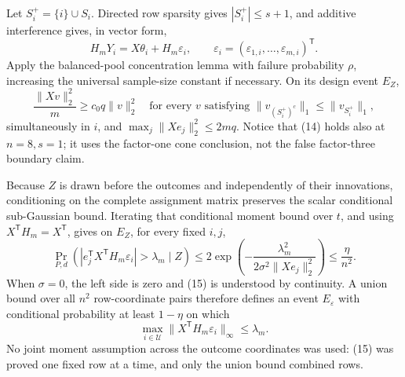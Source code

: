 Let \(S_i^+=\{i\}\cup S_i\).  Directed row sparsity gives \(|S_i^+|\le s+1\), and additive interference gives, in vector form,
\[
 H_mY_i=X\theta_i+H_m\varepsilon_i,
 \qquad
 \varepsilon_i=(\varepsilon_{1,i},\ldots,\varepsilon_{m,i})^{\mathsf T}.                       \tag{13}
\]
Apply the balanced-pool concentration lemma with failure probability \(\rho\), increasing the universal sample-size constant if necessary.  On its design event \(E_Z\),
\[
 \frac{\lVert Xv\rVert_2^2}{m}\ge c_0q\lVert v\rVert_2^2
 \quad\text{for every }v\text{ satisfying }
 \lVert v_{(S_i^+)^c}\rVert_1\le\lVert v_{S_i^+}\rVert_1,             \tag{14}
\]
simultaneously in \(i\), and \(\max_j\lVert Xe_j\rVert_2^2\le2mq\).  Notice that (14) holds also at \(n=8,s=1\); it uses the factor-one cone conclusion, not the false factor-three boundary claim.

Because \(Z\) is drawn before the outcomes and independently of their innovations, conditioning on the complete assignment matrix preserves the scalar conditional sub-Gaussian bound.  Iterating that conditional moment bound over \(t\), and using \(X^{\mathsf T}H_m=X^{\mathsf T}\), gives on \(E_Z\), for every fixed \(i,j\),
\[
 \Pr_{P,d}\!\left(\left|e_j^{\mathsf T}X^{\mathsf T}H_m\varepsilon_i\right|>\lambda_m\mid Z\right)
 \le2\exp\!\left(-\frac{\lambda_m^2}{2\sigma^2\lVert Xe_j\rVert_2^2}\right)
 \le\frac{\eta}{n^2}.                                                \tag{15}
\]
When \(\sigma=0\), the left side is zero and (15) is understood by continuity.  A union bound over all \(n^2\) row-coordinate pairs therefore defines an event \(E_\varepsilon\) with conditional probability at least \(1-\eta\) on which
\[
 \max_{i\in\mathcal U}\lVert X^{\mathsf T}H_m\varepsilon_i\rVert_\infty\le\lambda_m.          \tag{16}
\]
No joint moment assumption across the outcome coordinates was used: (15) was proved one fixed row at a time, and only the union bound combined rows.

